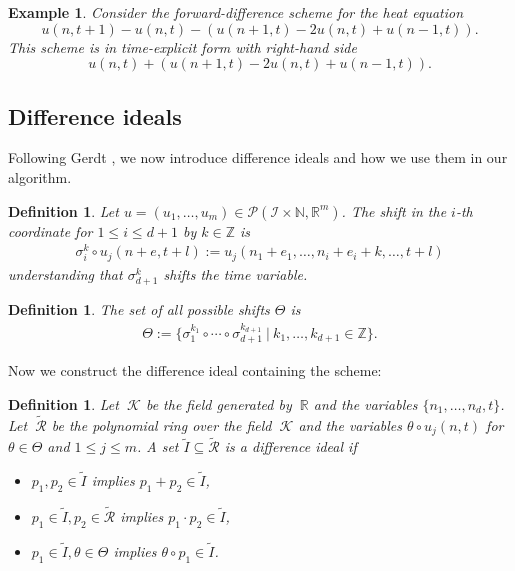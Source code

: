 \documentclass[sigconf,twocolumn]{acmart}
\newcommand{\Rr}{{\mathbb{R}}}
\newcommand{\Nn}{{\mathbb{N}}}
\newcommand{\Zz}{{\mathbb{Z}}}
\newcommand{\1}{{\chi}}
\newcommand{\Ii}{{\mathcal{I}}}
\numberwithin{equation}{section}
\theoremstyle{thmlemcorr}
\numberwithin{theorem}{section}
\theoremstyle{thmlemcorr*}
\theoremstyle{defi}
\newtheorem{definition}[theorem]{Definition}
\theoremstyle{remexample}
\newtheorem{example}[theorem]{Example}
\theoremstyle{ass}
\begin{document}
\begin{example}\label{timeexplicitheateq}
	Consider the forward-difference scheme for the heat equation \cite{smoller94}
	\begin{equation*}
		u(n,t+1)-u(n,t)-(u(n+1,t)-2u(n,t)+u(n-1,t)).
	\end{equation*}
	This scheme is in time-explicit form with right-hand side
	\begin{equation*}
		u(n,t)+(u(n+1,t)-2u(n,t)+u(n-1,t)).
	\end{equation*}
\end{example}
\subsection*{Difference ideals}\label{diffid}
Following Gerdt \cite{gerdt12}, we now introduce difference ideals and how we use them in our algorithm.
\begin{definition}
	Let $u=(u_1,\dots,u_m)\in\mathcal{P}(\Ii\times\Nn,\Rr^m)$. The shift in the $i$-th coordinate for $1\leq i\leq d+1$ by $k\in\Zz$ is
	\begin{gather*}
		\sigma_i^k\circ u_j(n+e,t+l):=u_j(n_1+e_1,\ldots,n_i+e_i+k,\ldots,t+l)
	\end{gather*}
	understanding that $\sigma_{d+1}^k$ shifts the time variable.
\end{definition}
\begin{definition}
	The set of all possible shifts $\Theta$ is
	\begin{gather*}
		\Theta:=\{\sigma_1^{k_1}\circ\cdots\circ\sigma_{d+1}^{k_{d+1}}\ |\ k_1,\ldots,k_{d+1}\in\Zz\}.
	\end{gather*}
\end{definition}
Now we construct the difference ideal containing the scheme:
\begin{definition}
	\label{diffideal}
	Let $\ \mathcal{K}$ be the field generated by $\ \Rr$ and the variables $\{n_1,\ldots,n_d,t\}$. Let $\ \tilde{\mathcal{R}}$ be the polynomial ring over the field $\ \mathcal{K}$ and the variables $\theta\circ u_j(n,t)$ for $\theta\in\Theta$ and $1\leq j\leq m$.
	A set $\tilde{I}\subseteq\tilde{\mathcal{R}}$ is a difference ideal if
	\begin{itemize}
		\item $p_1,p_2\in\tilde{I}$ implies $p_1+p_2\in\tilde{I}$,
		\item $p_1\in\tilde{I},p_2\in\tilde{\mathcal{R}}$ implies $p_1\cdot p_2\in\tilde{I}$,
		\item $p_1\in\tilde{I},\theta\in\Theta$ implies $\theta\circ p_1\in\tilde{I}$.
	\end{itemize}
\end{definition}
\end{document}
